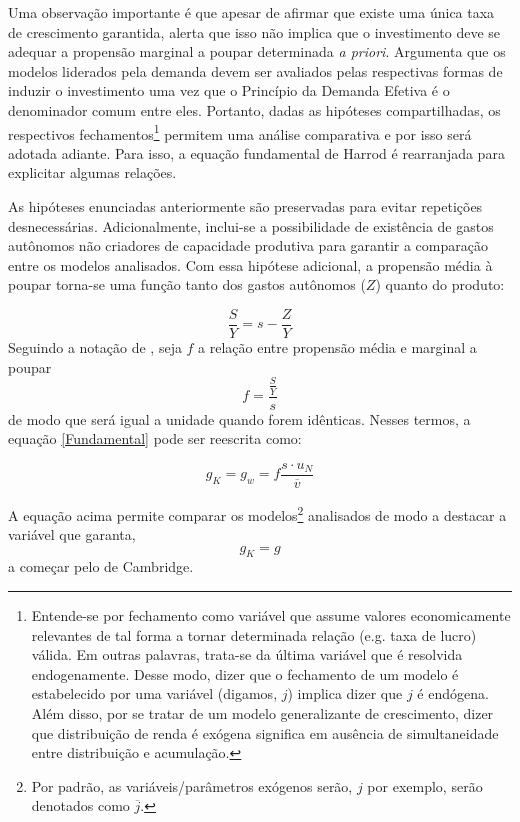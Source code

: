 Uma observação importante é que apesar de \textcite[p.~23]{harrod_essay_1939} afirmar que existe uma única taxa de crescimento garantida, \textcite[p.~83]{robinson_model_1962} alerta que isso não implica que o investimento %
deve se adequar a propensão marginal a poupar determinada \textit{a priori}. Argumenta que os modelos liderados pela demanda devem ser avaliados pelas respectivas formas de induzir o investimento uma vez que o Princípio da Demanda Efetiva é o denominador comum entre eles. Portanto, dadas as hipóteses compartilhadas, os respectivos  fechamentos\footnote{Entende-se por fechamento como variável que assume valores economicamente relevantes de tal forma a tornar determinada relação (e.g. taxa de lucro) válida. Em outras palavras, trata-se da última variável que é resolvida endogenamente. Desse modo, dizer que o fechamento de um modelo é estabelecido por uma variável (digamos, $j$) implica dizer que $j$ é endógena. Além disso, por se tratar de um modelo generalizante de crescimento, dizer que distribuição de renda é exógena significa em ausência de simultaneidade entre distribuição e acumulação.} permitem uma análise comparativa e por isso será adotada adiante. Para isso, a equação fundamental de Harrod é rearranjada para explicitar algumas relações.


As hipóteses enunciadas anteriormente são preservadas para evitar repetições desnecessárias. Adicionalmente, inclui-se a possibilidade de existência de gastos autônomos não criadores de capacidade produtiva para garantir a comparação entre os modelos analisados. Com essa hipótese adicional, a propensão média à poupar torna-se uma função tanto dos gastos autônomos ($Z$) quanto do produto:

\begin{equation}
\label{Poupanca_Super}
    \frac{S}{Y} = s - \frac{Z}{Y}
\end{equation}
Seguindo a notação de \textcite{serrano_sraffian_1995}, seja $f$ a relação entre propensão média e marginal a poupar
$$
f = \frac{\frac{S}{Y}}{s}
$$
de modo que será igual a unidade quando forem idênticas. Nesses termos, a equação \ref{Fundamental} pode ser reescrita como:

\begin{equation}
 \label{EqGeral}   
g_K = g_w = f\frac{s\cdot u_N}{\overline v}
\end{equation}

A equação acima permite comparar os modelos\footnote{Por padrão, as variáveis/parâmetros exógenos serão, $j$ por exemplo, serão denotados como $\overline j$.} analisados de modo a destacar a variável que garanta, 
$$
g_K = g
$$
a começar pelo de Cambridge.
